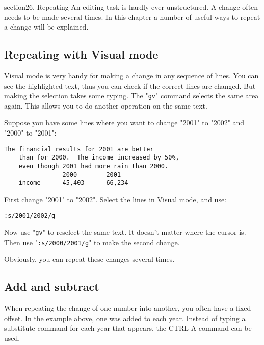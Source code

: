 section{26. Repeating}
An editing task is hardly ever unstructured.
A change often needs to be made several times.
In this chapter a number of useful ways to repeat a change will be explained.
\localtableofcontents
\subsection{Repeating with Visual mode}
Visual mode is very handy for making a change in any sequence of lines.
You can see the highlighted text, thus you can check if the correct lines are changed.
But making the selection takes some typing.
The "\texttt{gv}" command selects the same area again.
This allows you to do another operation on the same text.

Suppose you have some lines where you want to change "2001" to "2002" and "2000" to "2001":

\begin{Verbatim}[samepage=true]
    The financial results for 2001 are better 
    than for 2000.  The income increased by 50%, 
    even though 2001 had more rain than 2000. 
                2000        2001 
    income      45,403      66,234 
\end{Verbatim}

First change "2001" to "2002".  Select the lines in Visual mode, and use:

\begin{Verbatim}[samepage=true]
 :s/2001/2002/g
\end{Verbatim}

Now use "\texttt{gv}" to reselect the same text.
It doesn't matter where the cursor is.
Then use "\texttt{:s/2000/2001/g}" to make the second change.

Obviously, you can repeat these changes several times.
\subsection{Add and subtract}
When repeating the change of one number into another, you often have a fixed offset.
In the example above, one was added to each year.
Instead of typing a substitute command for each year that appears, the CTRL-A command can be used.

